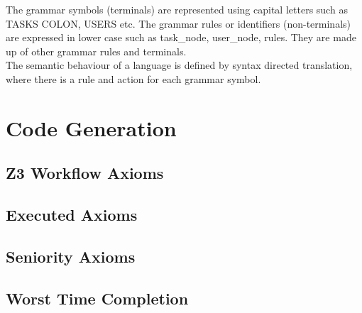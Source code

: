 \documentclass[a4paper]{report}
\begin{document}
The grammar symbols (terminals) are represented using capital letters such as TASKS COLON, USERS etc. The grammar rules or identifiers (non-terminals) are expressed in lower case such as task\_node, user\_node, rules. They are made up of other grammar rules and terminals.\\	
The semantic behaviour of a language is defined by syntax directed translation, where there is a rule and action for each grammar symbol. 

\section{Code Generation}
\subsection{Z3 Workflow Axioms}
\subsection{Executed Axioms}
\subsection{Seniority Axioms}
\subsection{Worst Time Completion}
\end{document}
